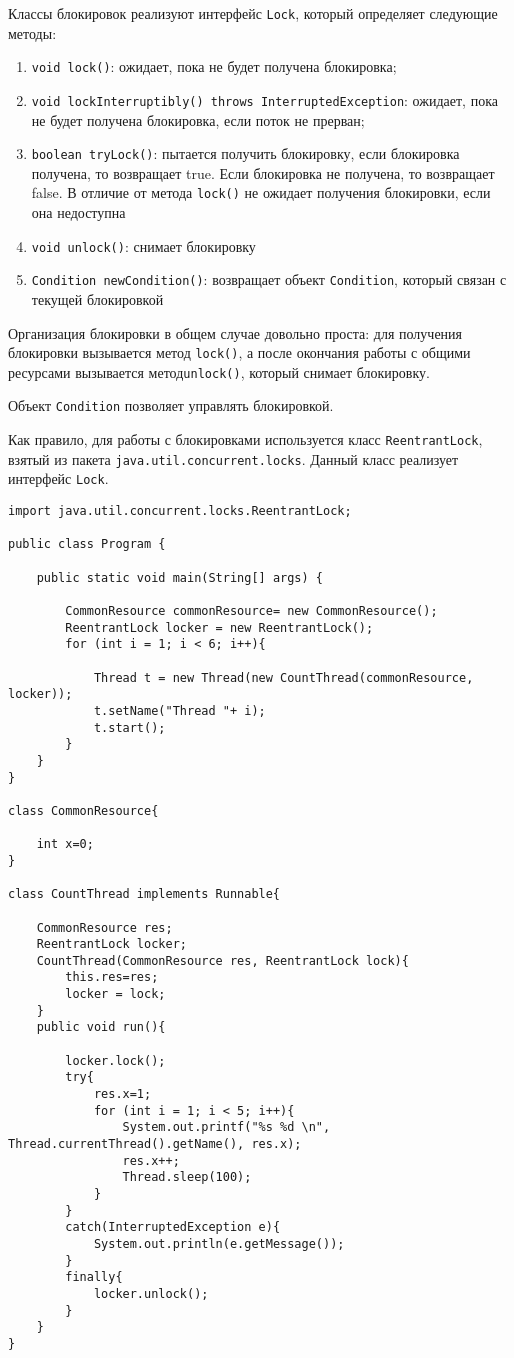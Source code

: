 Классы блокировок реализуют интерфейс \verb|Lock|, который определяет следующие методы:

\begin{enumerate}
    \item \verb|void lock()|: ожидает, пока не будет получена блокировка;
    \item \verb|void lockInterruptibly() throws InterruptedException|: ожидает, пока не будет получена блокировка, если поток не прерван;
    \item \verb|boolean tryLock()|: пытается получить блокировку, если блокировка получена, то возвращает true. Если блокировка не получена, то возвращает false. В отличие от метода \verb|lock()| не ожидает получения блокировки, если она недоступна
    \item \verb|void unlock()|: снимает блокировку
    \item \verb|Condition newCondition()|: возвращает объект \verb|Condition|, который связан с текущей блокировкой
\end{enumerate}

Организация блокировки в общем случае довольно проста: для получения блокировки вызывается метод \verb|lock()|, а после окончания работы с общими ресурсами вызывается метод\verb|unlock()|, который снимает блокировку.

Объект \verb|Condition| позволяет управлять блокировкой.

Как правило, для работы с блокировками используется класс \verb|ReentrantLock|, взятый из пакета 
\verb|java.util.concurrent.locks|. Данный класс реализует интерфейс \verb|Lock|.

\begin{lstlisting}
import java.util.concurrent.locks.ReentrantLock;
 
public class Program {
  
    public static void main(String[] args) {
          
        CommonResource commonResource= new CommonResource();
        ReentrantLock locker = new ReentrantLock();
        for (int i = 1; i < 6; i++){
              
            Thread t = new Thread(new CountThread(commonResource, locker));
            t.setName("Thread "+ i);
            t.start();
        }
    }
}
  
class CommonResource{
      
    int x=0;
}
  
class CountThread implements Runnable{
  
    CommonResource res;
    ReentrantLock locker;
    CountThread(CommonResource res, ReentrantLock lock){
        this.res=res;
        locker = lock;
    }
    public void run(){
         
        locker.lock();
        try{
            res.x=1;
            for (int i = 1; i < 5; i++){
                System.out.printf("%s %d \n", Thread.currentThread().getName(), res.x);
                res.x++;
                Thread.sleep(100);
            }
        }
        catch(InterruptedException e){
            System.out.println(e.getMessage());
        }
        finally{
            locker.unlock();
        }
    }
}
\end{lstlisting}

